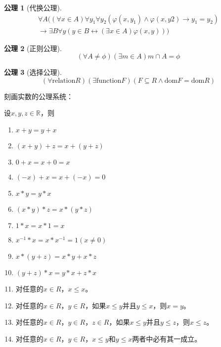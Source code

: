 \documentclass{book}[oneside]
\newtheorem{Ax}{公理}[chapter]
\begin{document}
\begin{CJK*}{UTF8}{gbsn}
\begin{Ax}[代换公理]
\begin{equation*}
\begin{split}
      \forall A ((\forall x \in A) \forall y_1 \forall y_2 (\varphi(x, y_1) \land \varphi(x, y2) \rightarrow y_1 = y_2)\\
      \rightarrow \exists B \forall y (y \in B \leftrightarrow (\exists x \in A) \varphi(x, y)))
    \end{split}
  \end{equation*}
  \end{Ax}
  \begin{Ax}[正则公理]
    \begin{equation*}
      (\forall A \neq \phi) (\exists m \in A) m \cap A = \phi
    \end{equation*}
  \end{Ax}
  \begin{Ax}[选择公理]
    \begin{equation*}
      (\forall \text{relation} R)
      (\exists \text{function} F)
      (F \subseteq R \land
      \text{dom} F
      = \text{dom} R)
    \end{equation*}
  \end{Ax}


  刻画实数的公理系统：

    设$x, y, z \in \mathbb{R}$，则
   \begin{enumerate}
   \item   $x + y = y + x$
   \item   $(x + y) + z = x + (y + z)$
   \item   $0 + x = x + 0 = x$
   \item   $(-x) + x =x + (-x) = 0$
   \item   $x * y = y * x$
   \item   $(x * y) * z = x * (y *z)$
   \item   $1 * x = x * 1 = x$
   \item   $x^{-1} * x = x * x^{-1} = 1 (x \neq 0)$
   \item   $x* (y + z) = x * y + x * z$
   \item   $(y + z) * x = y * x + z * x$
   \item 对任意的$x\in R$，$x\leq x$。
   \item 对任意的$x\in R$，$y\in R$，如果$x\leq y$并且$y\leq x$，则$x=y$。 
  \item 对任意的$x\in R$，$y\in R$，$z\in R$，如果$x\leq y$并且$y\leq z$，则$x\leq z$。
  \item 对任意的$x\in R$，$y\in R$，$x\leq y$和$y\leq x$两者中必有其一成立。
  

\end{enumerate}
\end{CJK*}
\end{document}
